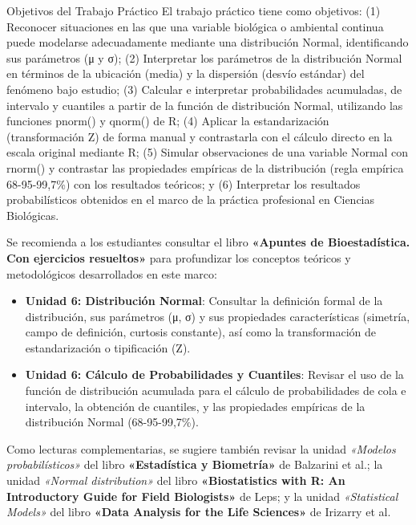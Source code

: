 \documentclass[
  spanish,
  letterpaper,
  DIV=11,
  numbers=noendperiod]{scrreprt}
\providecommand{\tightlist}{%
  \setlength{\itemsep}{0pt}\setlength{\parskip}{0pt}}
\begin{document}
Objetivos del Trabajo Práctico El trabajo práctico tiene como objetivos:
(1) Reconocer situaciones en las que una variable biológica o ambiental
continua puede modelarse adecuadamente mediante una distribución Normal,
identificando sus parámetros (μ y σ); (2) Interpretar los parámetros de
la distribución Normal en términos de la ubicación (media) y la
dispersión (desvío estándar) del fenómeno bajo estudio; (3) Calcular e
interpretar probabilidades acumuladas, de intervalo y cuantiles a partir
de la función de distribución Normal, utilizando las funciones pnorm() y
qnorm() de R; (4) Aplicar la estandarización (transformación Z) de forma
manual y contrastarla con el cálculo directo en la escala original
mediante R; (5) Simular observaciones de una variable Normal con rnorm()
y contrastar las propiedades empíricas de la distribución (regla
empírica 68-95-99,7\%) con los resultados teóricos; y (6) Interpretar
los resultados probabilísticos obtenidos en el marco de la práctica
profesional en Ciencias Biológicas.

\begin{tcolorbox}[enhanced jigsaw, arc=.35mm, bottomrule=.15mm, bottomtitle=1mm, breakable, colback=white, colbacktitle=quarto-callout-important-color!10!white, colframe=quarto-callout-important-color-frame, coltitle=black, left=2mm, leftrule=.75mm, opacityback=0, opacitybacktitle=0.6, rightrule=.15mm, title=\textcolor{quarto-callout-important-color}{\faExclamation}\hspace{0.5em}{Lectura Sugerida para el Trabajo Práctico}, titlerule=0mm, toprule=.15mm, toptitle=1mm]

Se recomienda a los estudiantes consultar el libro \textbf{«Apuntes de
Bioestadística. Con ejercicios resueltos»} para profundizar los
conceptos teóricos y metodológicos desarrollados en este marco:

\begin{itemize}
\tightlist
\item
  \textbf{Unidad 6: Distribución Normal}: Consultar la definición formal
  de la distribución, sus parámetros (μ, σ) y sus propiedades
  características (simetría, campo de definición, curtosis constante),
  así como la transformación de estandarización o tipificación (Z).
\item
  \textbf{Unidad 6: Cálculo de Probabilidades y Cuantiles}: Revisar el
  uso de la función de distribución acumulada para el cálculo de
  probabilidades de cola e intervalo, la obtención de cuantiles, y las
  propiedades empíricas de la distribución Normal (68-95-99,7\%).
\end{itemize}

Como lecturas complementarias, se sugiere también revisar la unidad
\emph{«Modelos probabilísticos»} del libro \textbf{«Estadística y
Biometría»} de Balzarini et al.; la unidad \emph{«Normal distribution»}
del libro \textbf{«Biostatistics with R: An Introductory Guide for Field
Biologists»} de Leps; y la unidad \emph{«Statistical Models»} del libro
\textbf{«Data Analysis for the Life Sciences»} de Irizarry et al.

\end{tcolorbox}
\end{document}
